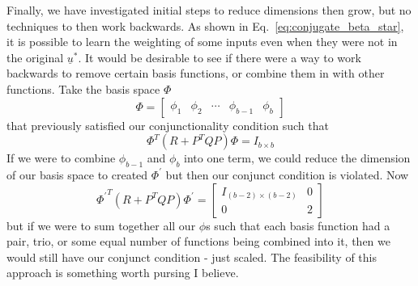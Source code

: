 Finally, we have investigated initial steps to reduce dimensions then grow, but no techniques to then work backwards. As shown in Eq.~\ref{eq:conjugate_beta_star}, it is possible to learn the weighting of some inputs even when they were not in the original $\underline{u}^\ast$. It would be desirable to see if there were a way to work backwards to remove certain basis functions, or combine them in with other functions. Take the basis space $\Phi$
\begin{equation}
    \Phi = 
    \begin{bmatrix}
        \phi_1 & \phi_2 & \cdots & \phi_{b-1} & \phi_{b}
    \end{bmatrix}
\end{equation}
that previously satisfied our conjunctionality condition such that
\begin{equation}
    \Phi^T (R + P^T Q P) \Phi = I_{b \times b}
\end{equation}
If we were to combine $\phi_{b-1}$ and $\phi_{b}$ into one term, we could reduce the dimension of our basis space to created $\Phi^\prime$ but then our conjunct condition is violated. Now
\begin{equation}
    {\Phi^\prime}^T (R + P^T Q P) \Phi^\prime 
    = 
    \begin{bmatrix}
        I_{(b-2) \times (b-2)} & 0 \\
        0 & 2
    \end{bmatrix}
\end{equation}
but if we were to sum together all our $\phi$s such that each basis function had a pair, trio, or some equal number of functions being combined into it, then we would still have our conjunct condition - just scaled. The feasibility of this approach is something worth pursing I believe.
